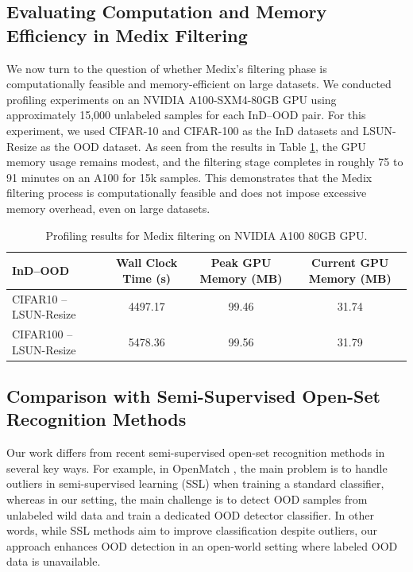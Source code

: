 \documentclass[10pt]{article} %
\theoremstyle{plain}
\theoremstyle{definition}
\begin{document}
\subsection{Evaluating Computation and Memory Efficiency in Medix Filtering} \label{appendix:compute-memory}
We now turn to the question of whether Medix’s filtering phase is computationally feasible and memory-efficient on large datasets. We conducted profiling experiments on an NVIDIA A100-SXM4-80GB GPU using approximately 15,000 unlabeled samples for each InD–OOD pair. 
For this experiment, we used CIFAR-10 and CIFAR-100 as the InD datasets and LSUN-Resize as the OOD dataset.
As seen from the results in Table \ref{tab:medix_profiling_results}, the GPU memory usage remains modest, and the filtering stage completes in roughly 75 to 91 minutes on an A100 for 15k samples. This demonstrates that the Medix filtering process is computationally feasible and does not impose excessive memory overhead, even on large datasets.
\begin{table}[ht]
\centering
\caption{Profiling results for Medix filtering on NVIDIA A100 80GB GPU.}
\footnotesize
\begin{tabular}{l@{\hskip 5pt}c@{\hskip 5pt}c@{\hskip 5pt}c}
\toprule
InD–OOD & Wall Clock Time (s) & Peak GPU Memory (MB) & Current GPU Memory (MB) \\
\midrule
CIFAR10 – LSUN-Resize & 4497.17 & 99.46 & 31.74 \\
CIFAR100 – LSUN-Resize & 5478.36 & 99.56 & 31.79 \\
\bottomrule
\end{tabular}
\label{tab:medix_profiling_results}
\end{table}


\subsection{Comparison with Semi-Supervised Open-Set Recognition Methods} \label{appendix:ssl_methods}
Our work differs from recent semi-supervised open-set recognition methods \citep{NEURIPS2021_da11e8cd, Fan_2023_ICCV, pmlr-v235-hang24a, wang2024scomatch} in several key ways.
For example, in OpenMatch \cite{NEURIPS2021_da11e8cd}, the main problem is to handle outliers in semi-supervised learning (SSL) when training a standard classifier, whereas in our setting, the main challenge is to detect OOD samples from unlabeled wild data and train a dedicated OOD detector classifier. In other words, while SSL methods \citep{NEURIPS2021_da11e8cd, Fan_2023_ICCV, pmlr-v235-hang24a, wang2024scomatch} aim to improve classification despite outliers, our approach enhances OOD detection in an open-world setting where labeled OOD data is unavailable.
\end{document}
